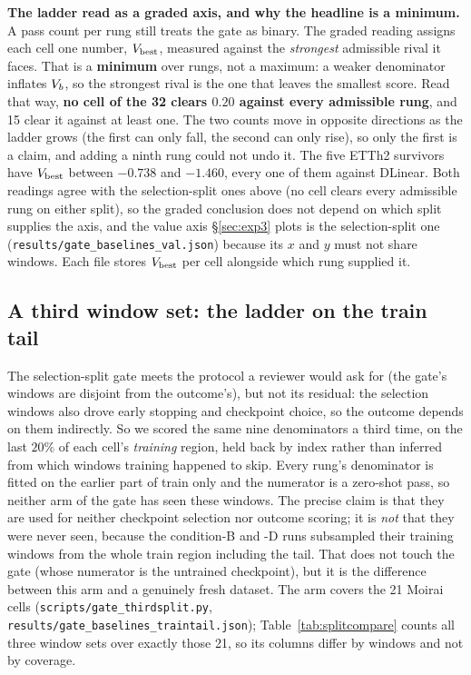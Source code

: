 \textbf{The ladder read as a graded axis, and why the headline is a minimum.}  A
pass count per rung still treats the gate as binary.  The graded reading assigns
each cell one number, $V_{\text{best}}$, measured against the
\emph{strongest} admissible rival it faces.  That is a \textbf{minimum} over
rungs, not a maximum: a weaker denominator inflates $V_{b}$, so the
strongest rival is the one that leaves the smallest score.  Read that way,
\textbf{no cell of the 32 clears $0.20$ against every admissible rung}, and 15
clear it against at least one.  The two counts move in opposite directions as the
ladder grows (the first can only fall, the second can only rise), so only the
first is a claim, and adding a ninth rung could not undo it.  The five ETTh2
survivors have $V_{\text{best}}$ between $-0.738$ and $-1.460$, every
one of them against DLinear.  Both readings agree with the selection-split ones
above (no cell clears every admissible rung on either split), so the graded
conclusion does not depend on which split supplies the axis, and the value axis
\S\ref{sec:exp3} plots is the selection-split one
(\texttt{results/gate\_baselines\_val.json}) because its $x$ and $y$ must not
share windows.  Each file stores $V_{\text{best}}$ per cell alongside
which rung supplied it.

\subsection{A third window set: the ladder on the train tail}
\label{app:baselines:traintail}

The selection-split gate meets the protocol a reviewer would ask for (the gate's
windows are disjoint from the outcome's), but not its residual: the selection windows
also drove early stopping and checkpoint choice, so the outcome depends on them
indirectly.  So we scored the same nine denominators a third time, on the last
$20\%$ of each cell's \emph{training} region, held back by index rather than inferred
from which windows training happened to skip.  Every rung's denominator is fitted on
the earlier part of train only and the numerator is a zero-shot pass, so neither arm
of the gate has seen these windows.  The precise claim is that they are used for
neither checkpoint selection nor outcome scoring; it is \emph{not} that they were
never seen, because the condition-B and -D runs subsampled their training windows
from the whole train region including the tail.  That does not touch the gate (whose
numerator is the untrained checkpoint), but it is the difference between this arm and
a genuinely fresh dataset.  The arm covers the 21 Moirai cells
(\texttt{scripts/gate\_thirdsplit.py}, \texttt{results/gate\_baselines\_traintail.json});
Table~\ref{tab:splitcompare} counts all three window sets over exactly those 21, so
its columns differ by windows and not by coverage.


